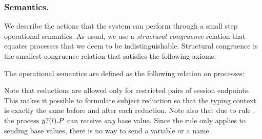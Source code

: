 \subsubsection{Semantics.}
We describe the actions that the system can perform through a small step operational semantics.
As usual, we use  a \emph{structural congruence} relation that equates processes that we deem to be indistinguishable. Structural congruence is the smallest congruence relation that satisfies the following axioms:

The operational semantics are defined as the following relation on processes:

Note that reductions are allowed only for restricted pairs of session endpoints. This makes it possible to formulate subject reduction so that the typing context is exactly the same before and after each reduction.
%
Note also that due to rule , the process \( y ? (l) . P \) can receive \emph{any} base value.
Since the rule  only applies to sending base values, there is no way to send a variable or a name.

